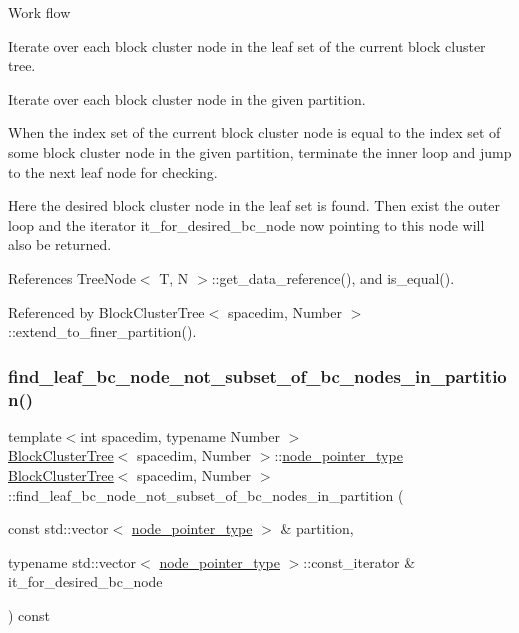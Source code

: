 \begin{DoxyDescription}
\item[Work flow ]

Iterate over each block cluster node in the leaf set of the current block cluster tree.

Iterate over each block cluster node in the given partition.

When the index set of the current block cluster node is equal to the index set of some block cluster node in the given partition, terminate the inner loop and jump to the next leaf node for checking.

Here the desired block cluster node in the leaf set is found. Then exist the outer loop and the iterator {\ttfamily it\+\_\+for\+\_\+desired\+\_\+bc\+\_\+node} now pointing to this node will also be returned.


\end{DoxyDescription}

References Tree\+Node$<$ T, N $>$\+::get\+\_\+data\+\_\+reference(), and is\+\_\+equal().



Referenced by Block\+Cluster\+Tree$<$ spacedim, Number $>$\+::extend\+\_\+to\+\_\+finer\+\_\+partition().

\mbox{\label{classBlockClusterTree_a97a99684ebd9ed470a79e56b73374068}} 
\subsubsection{\texorpdfstring{find\+\_\+leaf\+\_\+bc\+\_\+node\+\_\+not\+\_\+subset\+\_\+of\+\_\+bc\+\_\+nodes\+\_\+in\+\_\+partition()}{find\_leaf\_bc\_node\_not\_subset\_of\_bc\_nodes\_in\_partition()}}
{\footnotesize\ttfamily template$<$int spacedim, typename Number $>$ \\
\hyperlink{classBlockClusterTree}{Block\+Cluster\+Tree}$<$ spacedim, Number $>$\+::\hyperlink{classTreeNode}{node\+\_\+pointer\+\_\+type} \hyperlink{classBlockClusterTree}{Block\+Cluster\+Tree}$<$ spacedim, Number $>$\+::find\+\_\+leaf\+\_\+bc\+\_\+node\+\_\+not\+\_\+subset\+\_\+of\+\_\+bc\+\_\+nodes\+\_\+in\+\_\+partition (\begin{DoxyParamCaption}\item[{const std\+::vector$<$ \hyperlink{classTreeNode}{node\+\_\+pointer\+\_\+type} $>$ \&}]{partition,  }\item[{typename std\+::vector$<$ \hyperlink{classTreeNode}{node\+\_\+pointer\+\_\+type} $>$\+::const\+\_\+iterator \&}]{it\+\_\+for\+\_\+desired\+\_\+bc\+\_\+node }\end{DoxyParamCaption}) const\hspace{0.3cm}{\ttfamily [private]}}

